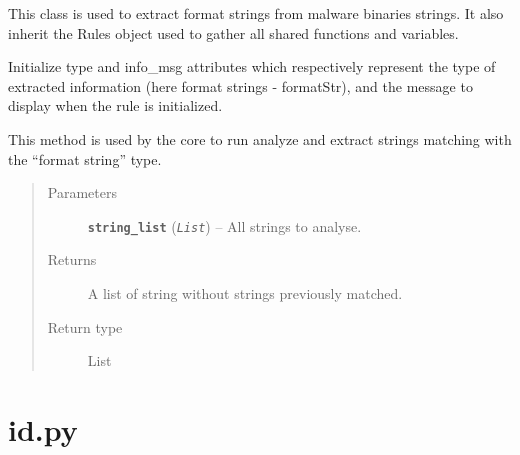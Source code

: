 \documentclass[letterpaper,10pt,oneside]{sphinxmanual}
\begin{document}
\begin{fulllineitems}
\label{index:lib.allRules.formatStr.FormatStr}
This class is used to extract format strings from malware
binaries strings. It also inherit the Rules object used to gather
all shared functions and variables.

\begin{fulllineitems}
\label{index:lib.allRules.formatStr.FormatStr.__init__}
Initialize type and info\_msg attributes which respectively represent
the type of extracted information (here format strings - formatStr),
and the message to display when the rule is initialized.

\end{fulllineitems}


\begin{fulllineitems}
\label{index:lib.allRules.formatStr.FormatStr.run_analysis}
This method is used by the core to run analyze and extract strings
matching with the ``format string'' type.
\begin{quote}\begin{description}
\item[{Parameters}] \leavevmode
\textbf{\texttt{string\_list}} (\emph{\texttt{List}}) -- All strings to analyse.

\item[{Returns}] \leavevmode
A list of string without strings previously matched.

\item[{Return type}] \leavevmode
List

\end{description}\end{quote}

\end{fulllineitems}


\end{fulllineitems}



\section{id.py}
\label{index:id-py}\label{index:module-lib.allRules.id}
\end{document}
